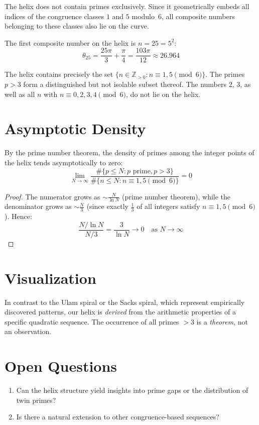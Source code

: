The helix does not contain primes exclusively. Since it geometrically embeds all indices of the
congruence classes $1$ and $5$ modulo~$6$, all
composite numbers belonging to these classes also lie on the curve.

\begin{example}
The first composite number on the helix is $n = 25 = 5^2$:
\[
\theta_{25} = \frac{25\pi}{3} + \frac{\pi}{4} = \frac{103\pi}{12} \approx 26.964
\]
\end{example}

\begin{remark}
The helix contains precisely the set $\{n \in \mathbb{Z}_{>0} : n \equiv 1, 5 \pmod{6}\}$.
The primes $p > 3$ form a distinguished but not
isolable subset thereof. The numbers $2$, $3$, as well as all $n$ with
$n \equiv 0, 2, 3, 4 \pmod{6}$, do not lie on the helix.
\end{remark}

\section{Asymptotic Density}

\begin{proposition}
By the prime number theorem, the density of primes among the integer points of the helix tends asymptotically to zero:
\[
\lim_{N \to \infty} \frac{\#\{p \leq N : p \text{ prime}, p > 3\}}{\#\{n \leq N : n \equiv 1, 5 \pmod{6}\}} = 0
\]
\end{proposition}

\begin{proof}
The numerator grows as $\sim \frac{N}{\ln N}$ (prime number theorem), while the denominator grows as $\sim \frac{N}{3}$ (since exactly $\frac{1}{3}$ of all integers satisfy $n \equiv 1, 5 \pmod{6}$). Hence:
\[
\frac{N/\ln N}{N/3} = \frac{3}{\ln N} \to 0 \quad\text{as } N \to \infty
\]
\end{proof}

\section{Visualization}

\begin{remark}
In contrast to the Ulam spiral or the Sacks spiral, which represent empirically discovered patterns, our helix is \emph{derived} from the arithmetic properties of a specific quadratic sequence. The occurrence of all primes $> 3$ is a \emph{theorem}, not an observation.
\end{remark}

\section{Open Questions}

\begin{enumerate}
\item Can the helix structure yield insights into prime gaps or the distribution of twin primes?
\item Is there a natural extension to other congruence-based sequences?
\end{enumerate}
